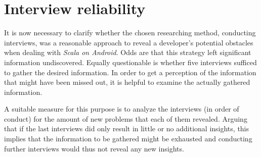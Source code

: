 \section{Interview reliability}

It is now necessary to clarify whether the chosen researching method, conducting interviews, was a reasonable approach to reveal a developer's potential obstacles when dealing with \textit{Scala on Android}. Odds are that this strategy left significant information undiscovered. Equally questionable is whether five interviews sufficed to gather the desired information. In order to get a perception of the information that might have been missed out, it is helpful to examine the actually gathered information.

A suitable measure for this purpose is to analyze the interviews (in order of conduct) for the amount of new problems that each of them revealed. Arguing that if the last interviews did only result in little or no additional insights, this implies that the information to be gathered might be exhausted and conducting further interviews would thus not reveal any new insights.

